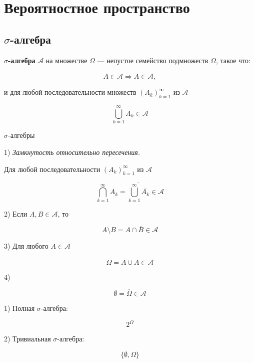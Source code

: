 \documentclass[12pt,a4paper]{article}
\begin{document}
\tableofcontents

\newpage

\section{Вероятностное пространство}

\subsection{\texorpdfstring{$\sigma$-алгебра}{sigma-алгебра}}

\begin{definition}
\textbf{$\sigma$-алгебра} $\mathcal{A}$ на множестве $\Omega$ — непустое семейство подмножеств $\Omega$, такое что:

\[
A\in\mathcal{A}
\Longrightarrow
\overline{A}\in\mathcal{A},
\]

и для любой последовательности множеств $(A_k)_{k=1}^{\infty}$ из $\mathcal{A}$

\[
\bigcup_{k=1}^{\infty}A_k\in\mathcal{A}
\]

\end{definition}

\begin{props}{$\sigma$-алгебры}

1) \textit{Замкнутость относительно пересечения.}

Для любой последовательности $(A_k)_{k=1}^{\infty}$ из $\mathcal{A}$

\[
\bigcap_{k=1}^{\infty}A_k
=
\overline{
\bigcup_{k=1}^{\infty}\overline{A_k}
}
\in\mathcal{A}
\]

\medskip

2) Если $A,B\in\mathcal{A}$, то

\[
A\setminus B
=
A\cap\overline{B}
\in\mathcal{A}
\]

\medskip

3) Для любого $A\in\mathcal{A}$

\[
\Omega=A\cup\overline{A}\in\mathcal{A}
\]

\medskip

4)

\[
\emptyset=\overline{\Omega}\in\mathcal{A}
\]

\end{props}


\begin{example}

1) Полная $\sigma$-алгебра:

\[
2^\Omega
\]

\medskip

2) Тривиальная $\sigma$-алгебра:

\[
\{\emptyset,\Omega\}
\]

\end{example}
\end{document}
